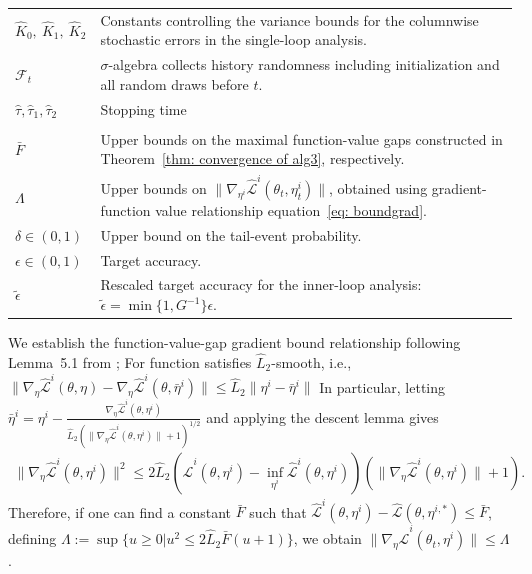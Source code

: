 \documentclass[twoside]{article} %
\def\eqref#1{equation~\ref{#1}}
\theoremstyle{plain}
\theoremstyle{definition}
\theoremstyle{remark}
\newcommand{\tepsilon}{\tilde{\epsilon}}
\newcommand{\htau}{\hat{\tau}}
\newcommand{\fhL}{\hat{\mathcal{L}}}
\begin{document}
\begin{longtable}{
    @{}
    >{\raggedright\arraybackslash}p{}
    >{\raggedright\arraybackslash}
      p{}
    @{}
}
$\hat K_0,\ \hat K_1,\ \hat K_2$
&
Constants controlling the variance bounds for the
columnwise stochastic errors in the single-loop analysis.
\\
$\mathcal{F}_t$
& 
$\sigma$-algebra collects history randomness including initialization and all random draws before $t$.
\\
$\htau,\htau_1,\htau_2$
& Stopping time
\\
\midrule
\multicolumn{2}{@{}l}{\textbf{Bounds and convergence parameters}}\\*
\addlinespace[2pt]

$\bar F$
&
Upper bounds on the maximal function-value gaps
constructed in Theorem~\ref{thm: convergence of alg3}, respectively.
\\


$\Lambda$
&
Upper bounds on
$\|\nabla_{\eta^i}\fhL^i(\theta_t,\eta_t^i)\|$, obtained using gradient-function value relationship \eqref{eq: boundgrad}.
\\

$\delta\in(0,1)$
&
Upper bound on the tail-event probability.
\\

$\epsilon\in(0,1)$
&
Target accuracy.
\\

$\tepsilon$
&
Rescaled target accuracy for the inner-loop analysis:
$\tepsilon
 =\min\{1,G^{-1}\}\epsilon$.
\\

\end{longtable}
\endgroup

We establish the function-value-gap gradient bound relationship following Lemma~5.1 from \citet{Haochuangensmooth}; 
For function satisfies $\hat{L}_2$-smooth, i.e., $
\|\nabla_{\eta} \fhL^i({\theta},\eta)-\nabla_{\eta} \fhL^i({\theta},\bar{\eta}^{i
}) \|\leq \hat{L}_2\|\eta^i-\bar{\eta}^i \|$
In particular, letting $\bar{\eta}^{i}=\eta^i-\frac{\nabla_{\eta} \fhL^i(\theta,\eta^i)}{\hat{L}_2(\|\nabla_{\eta} \fhL^i(\theta,\eta^i)\|+1)^{1/2}}$ and applying the descent lemma gives 
\begin{align}  
\|\nabla_{\eta} \fhL^i(\theta,\eta^{i})\|^2 \leq 2\hat{L}_2(\fhL^i(\theta,\eta^i)-\inf_{\eta^i}\fhL^i(\theta, \eta^{i}))(\|\nabla_{\eta} \fhL^i(\theta,\eta^{i})\|+ 1). \label{eq: boundgrad}
\end{align}
Therefore, if one can find a constant $\bar{F}$ such that $\fhL^i(\theta,\eta^i)-\fhL(\theta, \eta^{i,*})\leq \bar{F}$, defining $\Lambda := \sup\{u\geq 0| u^2\leq {2\hat{L}_2}\bar{F}(u+1) \}$, we obtain $\|\nabla_{\eta} \fhL^i(\theta_t,\eta^i)\|\leq \Lambda$.
\end{document}
